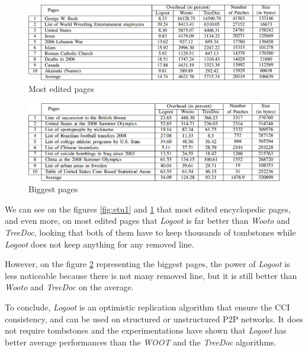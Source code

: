 \documentclass[11pt, a4paper]{article}
\begin{document}
 \begin{figure}[h!]
  \includegraphics[width=1\textwidth]{includes/etu1}
  \caption{Most edited pages}
  \label{fig:etu2}
 \end{figure}

 \begin{figure}[h!]
  \includegraphics[width=1\textwidth]{includes/etu3}
  \caption{Biggest pages}
  \label{fig:etu3}
 \end{figure}

 We can see on the figures \ref{fig:etu1} and \ref{fig:etu2} that most edited encyclopedic pages, and even more, on most edited pages that \emph{Logoot} is far better than \emph{Wooto} and \emph{TreeDoc}, looking that both of them have to keep thousands of tombstones while \emph{Logoot} does not keep anything for any removed line.

 However, on the figure \ref{fig:etu3} representing the biggest pages, the power of \emph{Logoot} is less noticeable because there is not many removed line, but it is still better than \emph{Wooto} and \emph{TreeDoc} on the average.

 To conclude, \emph{Logoot} is an optimistic replication algorithm that ensure the CCI consistency, and can be used on structured or unstructured P2P networks. It does not require tombstones and the experimentations have shown that \emph{Logoot} has better average performances than the \emph{WOOT} and the \emph{TreeDoc} algorithms.
\end{document}
